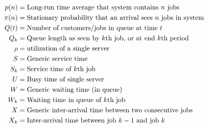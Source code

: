 \begin{align*}
 p(n) &= \text{Long-run time average that  system contains $n$ jobs} \\
 \pi(n) &= \text{Stationary probability that an arrival sees $n$ jobs in  system} \\
 Q(t) &= \text{Number of customers/jobs in queue at time $t$} \\
 Q_k &= \text{Queue length as seen by  $k$th job, or at  end  $k$th period} \\
 \rho &= \text{utilization of a single server} \\
 S &= \text{Generic service time} \\
 S_k &= \text{Service time of  $k$th job} \\
 U &= \text{Busy time of single server} \\
 W &= \text{Generic waiting time (in  queue)} \\
 W_{k} &= \text{Waiting time in  queue of $k$th job} \\
 X &= \text{Generic inter-arrival time between two consecutive jobs} \\
 X_k &= \text{Inter-arrival time between job $k-1$ and job $k$} \\
\end{align*}



